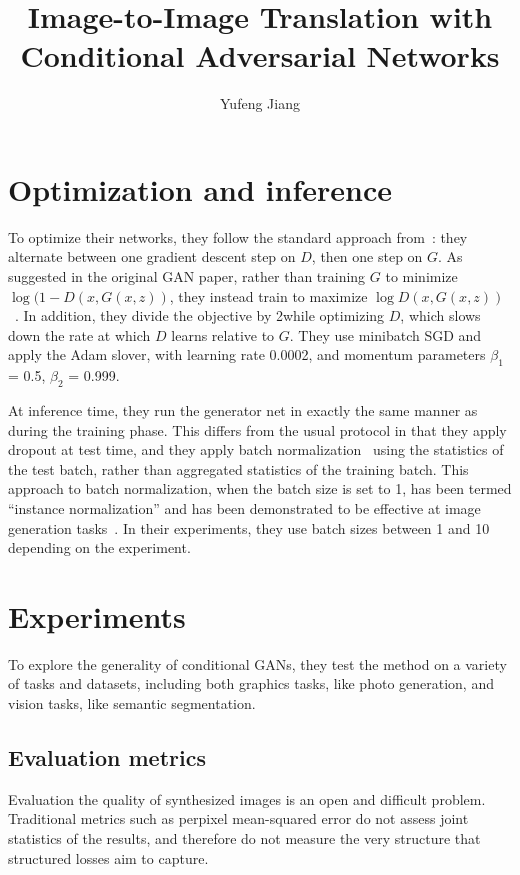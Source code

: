 \documentclass[10pt,twocolumn,letterpaper]{article}
\begin{document}
\title{Image-to-Image Translation with Conditional Adversarial Networks}
\author{Yufeng Jiang}
\maketitle

\section{Optimization and inference}

To optimize their networks, they follow the standard approach from~\cite{Generative}: they alternate between one gradient descent step on $D$, then one step on $G$. As suggested in the original GAN paper, rather than training $G$ to minimize $\log(1-D(x, G(x, z))$, they instead train to maximize $\log D(x, G(x, z))$~\cite{Generative}. In addition, they divide the objective by 2while optimizing $D$, which slows down the rate at which $D$ learns relative to $G$. They use minibatch SGD and apply the Adam slover, with learning rate 0.0002, and momentum parameters $\beta_1$ = 0.5, $\beta_2$ = 0.999.

At inference time, they run the generator net in exactly the same manner as during the training phase. This differs from the usual protocol in that they apply dropout at test time, and they apply batch normalization~\cite{batch} using the statistics of the test batch, rather than aggregated statistics of the training batch. This approach to batch normalization, when the batch size is set to 1, has been termed ``instance normalization'' and has been demonstrated to be effective at image generation tasks~\cite{Instance}. In their experiments, they use batch sizes between 1 and 10 depending on the experiment. 

\section{Experiments}

To explore the generality of conditional GANs, they test the method on a variety of tasks and datasets, including both graphics tasks, like photo generation, and vision tasks, like semantic segmentation.

\subsection{Evaluation metrics}

Evaluation the quality of synthesized images is an open and difficult problem. Traditional metrics such as perpixel mean-squared error do not assess joint statistics of the results, and therefore do not measure the very structure that structured losses aim to capture.
\end{document}
